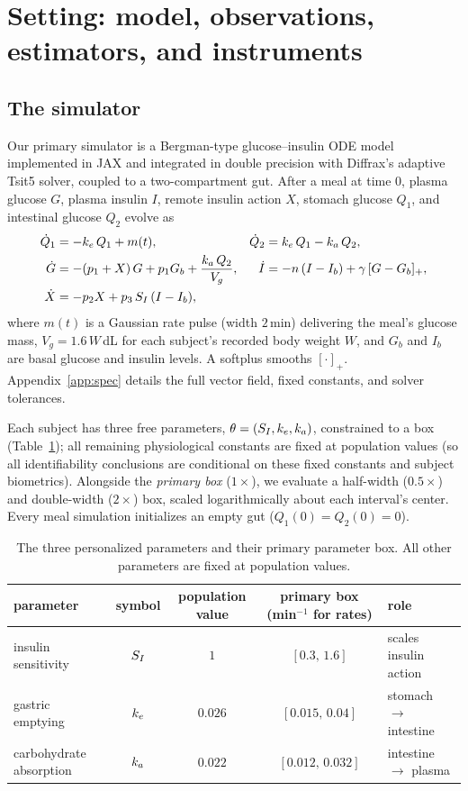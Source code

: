 \section{Setting: model, observations, estimators, and instruments}
\label{sec:setting}

\subsection{The simulator}
\label{sec:model}

Our primary simulator is a Bergman-type glucose--insulin ODE model implemented in JAX and integrated in double precision with Diffrax's adaptive Tsit5 solver, coupled to a two-compartment gut.
After a meal at time $0$, plasma glucose $G$, plasma insulin $I$, remote insulin action $X$, stomach glucose $Q_1$, and intestinal glucose $Q_2$ evolve as
\begin{align}
\dot Q_1 &= -k_e\, Q_1 + m(t), &
\dot Q_2 &= k_e\, Q_1 - k_a\, Q_2, \label{eq:gut}\\
\dot G &= -(p_1 + X)\,G + p_1 G_b + \frac{k_a\, Q_2}{V_g}, &
\dot I &= -n\,(I - I_b) + \gamma\,[G - G_b]_+, \label{eq:glucose}\\
\dot X &= -p_2 X + p_3\, S_I\,(I - I_b), \label{eq:action}
\end{align}
where $m(t)$ is a Gaussian rate pulse (width $2$\,min) delivering the meal's glucose mass, $V_g=1.6\,W$\,dL for each subject's recorded body weight $W$, and $G_b$ and $I_b$ are basal glucose and insulin levels.
A softplus smooths $[\cdot]_+$.
Appendix~\ref{app:spec} details the full vector field, fixed constants, and solver tolerances.

Each subject has three free parameters, $\theta=(S_I,k_e,k_a)$, constrained to a box (Table~\ref{tab:bounds}); all remaining physiological constants are fixed at population values (so all identifiability conclusions are conditional on these fixed constants and subject biometrics).
Alongside the \emph{primary box} ($1\times$), we evaluate a half-width ($0.5\times$) and double-width ($2\times$) box, scaled logarithmically about each interval's center.
Every meal simulation initializes an empty gut ($Q_1(0)=Q_2(0)=0$).

\begin{table}[tbp]
\centering\small
\begin{tabular}{lcccl}
\toprule
parameter & symbol & population value & primary box (min$^{-1}$ for rates) & role \\
\midrule
insulin sensitivity & $S_I$ & $1$ & $[0.3,\,1.6]$ & scales insulin action \\
gastric emptying & $k_e$ & $0.026$ & $[0.015,\,0.04]$ & stomach $\to$ intestine \\
carbohydrate absorption & $k_a$ & $0.022$ & $[0.012,\,0.032]$ & intestine $\to$ plasma \\
\bottomrule
\end{tabular}
\caption{The three personalized parameters and their primary parameter box. All other parameters are fixed at population values.}
\label{tab:bounds}
\end{table}

